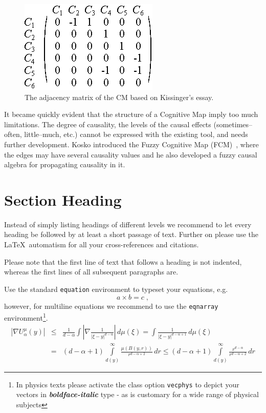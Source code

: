 \documentclass[graybox]{svmult}
\begin{document}
\begin{figure}[hbt]
  \sidecaption
  \includegraphics[scale=1]{kissingerMtx}
  \caption{The adjacency matrix of the CM based on Kissinger's essay.}
  \label{fig:kissingerMtx}
\end{figure}

It became quickly evident that the structure of a Cognitive Map imply too much limitations. The degree of causality, the levels of the causal effects (sometimes--often, little--much, etc.) cannot be expressed with the existing tool, and needs further development. Kosko introduced the Fuzzy Cognitive Map (FCM)~\cite{b.kosko1986}, where the edges may have several causality values and he also developed a fuzzy causal algebra for propagating causality in it.



\section{Section Heading}
\label{sec:2}
Instead of simply listing headings of different levels we recommend to let every heading be followed by at least a short passage of text.  Further on please use the \LaTeX\ automatism for all your cross-references and citations.

Please note that the first line of text that follows a heading is not indented, whereas the first lines of all subsequent paragraphs are.

Use the standard \verb|equation| environment to typeset your equations, e.g.
%
\begin{equation}
a \times b = c\;,
\end{equation}
%
however, for multiline equations we recommend to use the \verb|eqnarray| environment\footnote{In physics texts please activate the class option \texttt{vecphys} to depict your vectors in \textbf{\itshape boldface-italic} type - as is customary for a wide range of physical subjects}.
\begin{eqnarray}
\left|\nabla U_{\alpha}^{\mu}(y)\right| &\le&\frac1{d-\alpha}\int
\left|\nabla\frac1{|\xi-y|^{d-\alpha}}\right|\,d\mu(\xi) =
\int \frac1{|\xi-y|^{d-\alpha+1}} \,d\mu(\xi)  \\
&=&(d-\alpha+1) \int\limits_{d(y)}^\infty
\frac{\mu(B(y,r))}{r^{d-\alpha+2}}\,dr \le (d-\alpha+1)
\int\limits_{d(y)}^\infty \frac{r^{d-\alpha}}{r^{d-\alpha+2}}\,dr
\label{eq:01}
\end{eqnarray}
\end{document}
